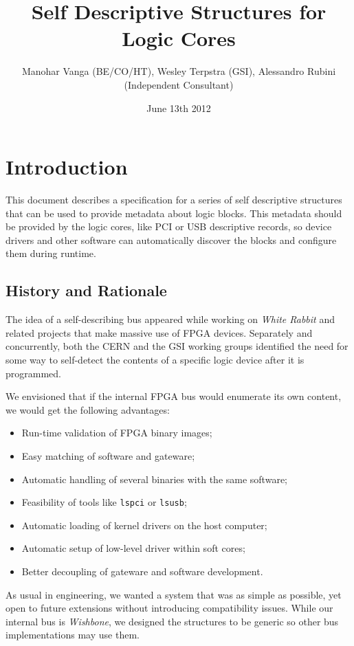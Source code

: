 \documentclass[a4paper, 12pt]{article}
\title{Self Descriptive Structures for Logic Cores}
\author{Manohar Vanga (BE/CO/HT), Wesley Terpstra (GSI), Alessandro Rubini (Independent Consultant)}
\date{June 13th 2012}
\begin{document}
\maketitle

\tableofcontents
\listoftables
\listoffigures

\pagebreak

\section{Introduction}

This document describes a specification for a series of self descriptive
structures that can be used to provide metadata about logic blocks. This metadata
should be provided by the logic cores, like PCI or USB descriptive records,
so device drivers and other software can automatically discover the blocks and
configure them during runtime.

\subsection{History and Rationale}

The idea of a self-describing bus appeared while working on
\textit{White Rabbit} and related projects that make massive use of
FPGA devices. Separately and concurrently, both the CERN and the GSI
working groups identified the need for some way to self-detect the
contents of a specific logic device after it is programmed.

We envisioned that if the internal FPGA bus would enumerate its own
content, we would get the following advantages:

\begin{itemize}
\item Run-time validation of FPGA binary images;
\item Easy matching of software and gateware;
\item Automatic handling of several binaries with the same software;
\item Feasibility of tools like \texttt{lspci} or \texttt{lsusb};
\item Automatic loading of kernel drivers on the host computer;
\item Automatic setup of low-level driver within soft cores;
\item Better decoupling of gateware and software development.
\end{itemize}

As usual in engineering, we wanted a system that was as simple as possible,
yet open to future extensions without introducing compatibility issues.
While our internal bus is \textit{Wishbone}, we designed the structures
to be generic so other bus implementations may use them. 
\end{document}
